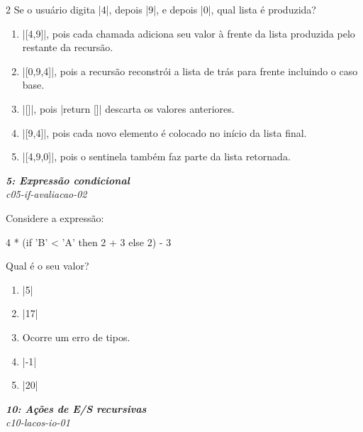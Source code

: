 \documentclass[a4paper,10pt,brazil]{article}
\begin{document}
\begin{multicols}{2}
Se o usuário digita \haskellinline|4|, depois \haskellinline|9|, e depois \haskellinline|0|, qual lista é produzida?

\begin{enumerate}
  \item \haskellinline|[4,9]|, pois cada chamada adiciona seu valor à frente da lista produzida pelo restante da recursão.

  \item \haskellinline|[0,9,4]|, pois a recursão reconstrói a lista de trás para frente incluindo o caso base.

  \item \haskellinline|[]|, pois \haskellinline|return []| descarta os valores anteriores.

  \item \haskellinline|[9,4]|, pois cada novo elemento é colocado no início da lista final.

  \item \haskellinline|[4,9,0]|, pois o sentinela também faz parte da lista retornada.


\end{enumerate}

\begin{flushright}
  \footnotesize
  \textit{\textbf{5: Expressão condicional}}\\
  \textit{c05-if-avaliacao-02}\\

\end{flushright}
Considere a expressão:
\begin{haskellcode}
4 * (if 'B' < 'A' then 2 + 3 else 2) - 3
\end{haskellcode}
Qual é o seu valor?

\begin{enumerate}
  \item \haskellinline|5|

  \item \haskellinline|17|

  \item Ocorre um erro de tipos.

  \item \haskellinline|-1|

  \item \haskellinline|20|


\end{enumerate}

\begin{flushright}
  \footnotesize
  \textit{\textbf{10: Ações de E/S recursivas}}\\
  \textit{c10-lacos-io-01}\\


\end{flushright}
\end{multicols}
\end{document}
